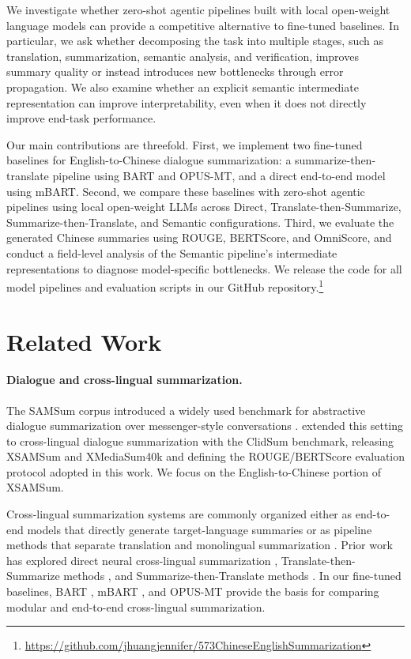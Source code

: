\documentclass[11pt]{article}
\begin{document}
We investigate whether zero-shot agentic pipelines built with local open-weight language models can provide a competitive alternative to fine-tuned baselines. In particular, we ask whether decomposing the task into multiple stages, such as translation, summarization, semantic analysis, and verification, improves summary quality or instead introduces new bottlenecks through error propagation. We also examine whether an explicit semantic intermediate representation can improve interpretability, even when it does not directly improve end-task performance.

Our main contributions are threefold. First, we implement two fine-tuned baselines for English-to-Chinese dialogue summarization: a summarize-then-translate pipeline using BART and OPUS-MT, and a direct end-to-end model using mBART. Second, we compare these baselines with zero-shot agentic pipelines using local open-weight LLMs across Direct, Translate-then-Summarize, Summarize-then-Translate, and Semantic configurations. Third, we evaluate the generated Chinese summaries using ROUGE, BERTScore, and OmniScore, and conduct a field-level analysis of the Semantic pipeline's intermediate representations to diagnose model-specific bottlenecks. We release the code for all model pipelines and evaluation scripts in our GitHub repository.\footnote{\url{https://github.com/jhuangjennifer/573ChineseEnglishSummarization}}


\section{Related Work}

\paragraph{Dialogue and cross-lingual summarization.}
The SAMSum corpus introduced a widely used benchmark for abstractive dialogue summarization over messenger-style conversations \citep{gliwa-etal-2019-samsum}. \citet{wang-etal-2022-clidsum} extended this setting to cross-lingual dialogue summarization with the ClidSum benchmark, releasing XSAMSum and XMediaSum40k and defining the ROUGE/BERTScore evaluation protocol adopted in this work. We focus on the English-to-Chinese portion of XSAMSum.

Cross-lingual summarization systems are commonly organized either as end-to-end models that directly generate target-language summaries or as pipeline methods that separate translation and monolingual summarization \citep{wang-etal-2022-survey-cls}. Prior work has explored direct neural cross-lingual summarization \citep{zhu-etal-2019-ncls,zhu-etal-2020-attend}, Translate-then-Summarize methods \citep{ouyang-etal-2019-robust}, and Summarize-then-Translate methods \citep{wan-etal-2010-cross,parnell-etal-2024-sumtra}. In our fine-tuned baselines, BART \citep{lewis2020bart}, mBART \citep{liu2020multilingual,tang-etal-2021-multilingual}, and OPUS-MT \citep{tiedemann2020opusmt} provide the basis for comparing modular and end-to-end cross-lingual summarization.
\end{document}
